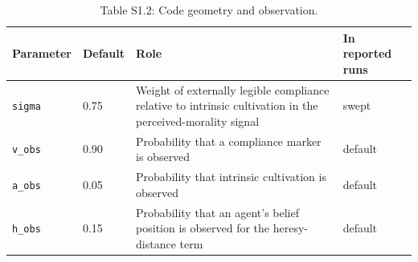 \documentclass[12pt]{article}
\begin{document}
\begin{table}[htbp]
\centering
\footnotesize
\caption{Table S1.2: Code geometry and observation.}
\begin{tabular}{p{4.9cm}p{1.3cm}p{4.5cm}p{2.4cm}}
\toprule
Parameter & Default & Role & In reported runs \\
\midrule
\texttt{sigma} & 0.75 & Weight of externally legible compliance relative to intrinsic cultivation in the perceived-morality signal & swept \\
\texttt{v\_obs} & 0.90 & Probability that a compliance marker is observed & default \\
\texttt{a\_obs} & 0.05 & Probability that intrinsic cultivation is observed & default \\
\texttt{h\_obs} & 0.15 & Probability that an agent's belief position is observed for the heresy-distance term & default \\
\bottomrule
\end{tabular}
\end{table}
\end{document}
